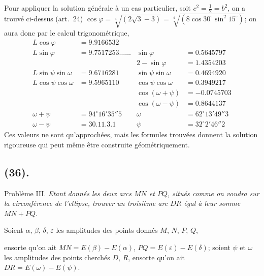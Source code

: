 \documentclass{article}
\begin{document}
Pour appliquer la solution générale à un cas particulier, soit $c^{2}=\frac{1}{2}=b^{2}$, on a trouvé ci-dessus (art.~24) $\cos\varphi=\sqrt[4]{(2\sqrt{3}-3)}=\sqrt[4]{(8\cos 30^{\circ}\sin^{2}15^{\circ})}$; on aura donc par le calcul trigonométrique,
\[ \begin{aligned} L\cos\varphi&=9.9166532 & &\\ L\sin\varphi&=9.7517253\ldots\ldots & \sin\varphi&=0.5645797\\ & & 2-\sin\varphi&=1.4354203\\ L\sin\psi\sin\omega&=9.6716281 & \sin\psi\sin\omega&=0.4694920\\ L\cos\psi\cos\omega&=9.5965110 & \cos\psi\cos\omega&=0.3949217\\ & & \cos(\omega+\psi)&=-0.0745703\\ & & \cos(\omega-\psi)&=0.8644137\\ \omega+\psi&=94^{\circ}16'35''5 & \omega&=62^{\circ}13'49''3\\ \omega-\psi&=30.11.3.1 & \psi&=32^{\circ}2'46''2 \end{aligned} \]
Ces valeurs ne sont qu'approchées, mais les formules trouvées donnent la solution rigoureuse qui peut même être construite géométriquement.


\subsection*{(36).}

Problème III. \emph{Etant donnés les deux arcs $MN$ et $PQ$, situés comme on voudra sur la circonférence de l'ellipse, trouver un troisième arc $DR$ égal à leur somme $MN+PQ$.}

Soient $\alpha$, $\beta$, $\delta$, $\varepsilon$ les amplitudes des points donnés $M$, $N$, $P$, $Q$,

ensorte qu'on ait $MN=E(\beta)-E(\alpha)$, $PQ=E(\varepsilon)-E(\delta)$; soient $\psi$ et $\omega$ les amplitudes des points cherchés $D$, $R$, ensorte qu'on ait $DR=E(\omega)-E(\psi)$.
\end{document}

